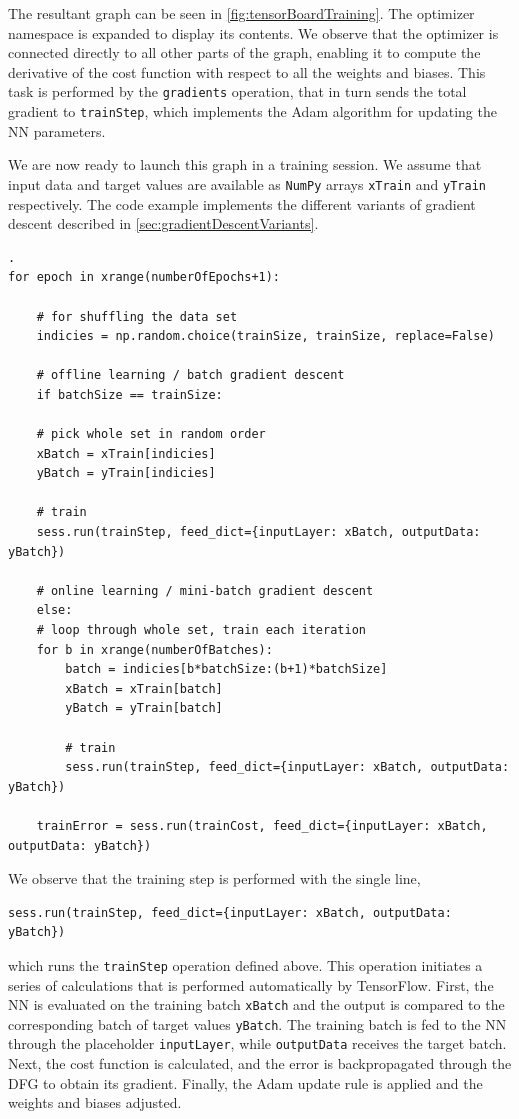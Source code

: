 \documentclass[twoside,english]{uiofysmaster}
\begin{document}
The resultant graph can be seen in \autoref{fig:tensorBoardTraining}. 
The optimizer namespace is expanded to display its contents. 
We observe that the optimizer is connected directly to all other parts of the graph, enabling it
to compute the derivative of the cost function with respect to all the weights and biases. This task is
performed by the \texttt{gradients} operation, that in turn sends the total gradient to \texttt{trainStep}, 
which implements the Adam algorithm for updating the NN parameters. 

We are now ready to launch this graph in a training session. We assume that input data
and target values are available as \texttt{NumPy} arrays \texttt{xTrain} and \texttt{yTrain} respectively. 
The code example implements the different variants of gradient descent described in \autoref{sec:gradientDescentVariants}. 
\begin{verbatim}.
for epoch in xrange(numberOfEpochs+1): 
    
    # for shuffling the data set
    indicies = np.random.choice(trainSize, trainSize, replace=False)
    
    # offline learning / batch gradient descent
    if batchSize == trainSize:    
	
	# pick whole set in random order               
	xBatch = xTrain[indicies]
	yBatch = yTrain[indicies]
	
	# train
	sess.run(trainStep, feed_dict={inputLayer: xBatch, outputData: yBatch})
	
    # online learning / mini-batch gradient descent
    else:                      
	# loop through whole set, train each iteration
	for b in xrange(numberOfBatches):
	    batch = indicies[b*batchSize:(b+1)*batchSize]
	    xBatch = xTrain[batch]
	    yBatch = yTrain[batch]
	    
	    # train
	    sess.run(trainStep, feed_dict={inputLayer: xBatch, outputData: yBatch})
	    
    trainError = sess.run(trainCost, feed_dict={inputLayer: xBatch, outputData: yBatch})
\end{verbatim}
We observe that the training step is performed with the single line,
\begin{verbatim}
sess.run(trainStep, feed_dict={inputLayer: xBatch, outputData: yBatch})
\end{verbatim}
which runs the \texttt{trainStep} operation defined above. This operation initiates a series of
calculations that is performed automatically by TensorFlow. 
First, the NN is evaluated on the training batch \texttt{xBatch} and the output is compared to the corresponding
batch of target values \texttt{yBatch}. The training batch is fed to the NN through the placeholder
\texttt{inputLayer}, while \texttt{outputData} receives the target batch. Next, the cost function 
is calculated, and the error is backpropagated through the DFG to obtain its gradient. Finally, 
the Adam update rule is applied and the weights and biases adjusted. 
\end{document}
